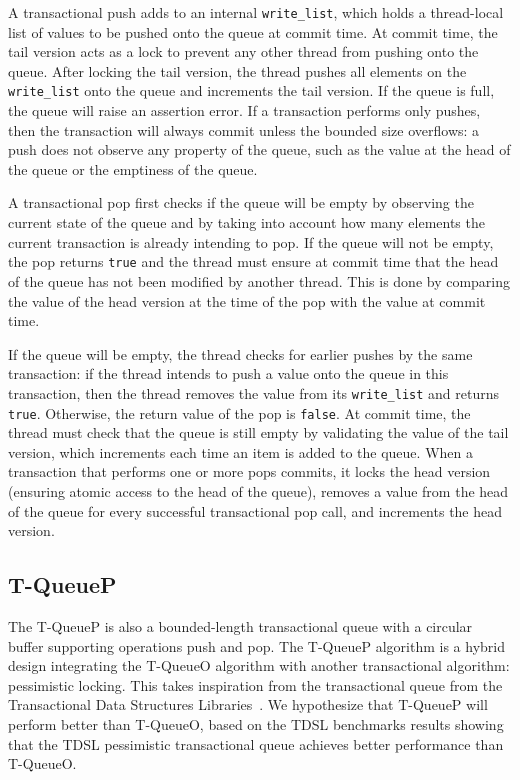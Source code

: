 A transactional push adds to an internal \texttt{write\_list}, which holds a thread-local list of values to be pushed onto the queue at commit time. At commit time, the tail version acts as a lock to prevent any other thread from pushing onto the queue. After locking the tail version, the thread pushes all elements on the \texttt{write\_list} onto the queue and increments the tail version. If the queue is full, the queue will raise an assertion error.
If a transaction performs only pushes, then the transaction will always commit unless the bounded size overflows: a push does not observe any property of the queue, such as the value at the head of the queue or the emptiness of the queue. 

A transactional pop first checks if the queue will be empty by observing the current state of the queue and by taking into account how many elements the current transaction is already intending to pop. If the queue will not be empty, the pop returns \texttt{true} and the thread must ensure at commit time that the head of the queue has not been modified by another thread. This is done by comparing the value of the head version at the time of the pop with the value at commit time. 

If the queue will be empty, the thread checks for earlier pushes by the same transaction: if the thread intends to push a value onto the queue in this transaction, then the thread removes the value from its \texttt{write\_list} and returns \texttt{true}. Otherwise, the return value of the pop is \texttt{false}. At commit time, the thread must check that the queue is still empty by validating the value of the tail version, which increments each time an item is added to the queue.
When a transaction that performs one or more pops commits, it locks the head version (ensuring atomic access to the head of the queue), removes a value from the head of the queue for every successful transactional pop call, and increments the head version.


\subsection{T-QueueP}
The T-QueueP is also a bounded-length transactional queue with a circular buffer supporting operations push and pop. The T-QueueP algorithm is a hybrid design integrating the T-QueueO algorithm with another transactional algorithm: pessimistic locking. This takes inspiration from the transactional queue from the Transactional Data Structures Libraries~\cite{tdsl}. We hypothesize that T-QueueP will perform better than T-QueueO, based on the TDSL benchmarks results showing that the TDSL pessimistic transactional queue achieves better performance than T-QueueO. 

